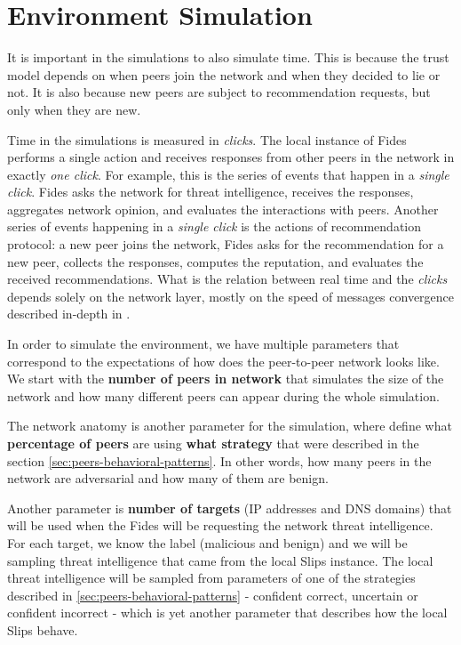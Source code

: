 \section{Environment Simulation}
\label{sec:environment-simulation}
It is important in the simulations to also simulate time. This is because the trust model depends on when peers join the network and when they decided to lie or not. It is also because new peers are subject to recommendation requests, but only when they are new.

Time in the simulations is measured in \textit{clicks}. 
The local instance of Fides performs a single action and receives responses from other peers in the network in exactly \textit{one click}. 
For example, this is the series of events that happen in a \textit{single click}. Fides asks the network for threat intelligence, receives the responses, aggregates network opinion, and evaluates the interactions with peers.
Another series of events happening in a \textit{single click} is the actions of  recommendation protocol: a new peer joins the network, Fides asks for the recommendation for  a new peer, collects the responses, computes the reputation, and evaluates the received recommendations.
What is the relation between real time and the \textit{clicks} depends solely on the network layer, mostly on the speed of messages convergence described in-depth in \cite{nl}.

In order to simulate the environment, we have multiple parameters that correspond to the expectations of how does the peer-to-peer network looks like.
We start with the \textbf{number of peers in network} that simulates the size of the network and how many different peers can appear during the whole simulation.

The network anatomy is another parameter for the simulation, where define what \textbf{percentage of peers} are using \textbf{what strategy} that were described in the section \ref{sec:peers-behavioral-patterns}. 
In other words, how many peers in the network are adversarial and how many of them are benign.

Another parameter is \textbf{number of targets} (IP addresses and DNS domains) that will be used when the Fides will be requesting the network threat intelligence.
For each target, we know the label (malicious and benign) and we will be sampling threat intelligence that came from the local Slips instance. 
The local threat intelligence will be sampled from parameters of one of the strategies described in \ref{sec:peers-behavioral-patterns} - confident correct, uncertain or confident incorrect - which is yet another parameter that describes how the local Slips behave.

